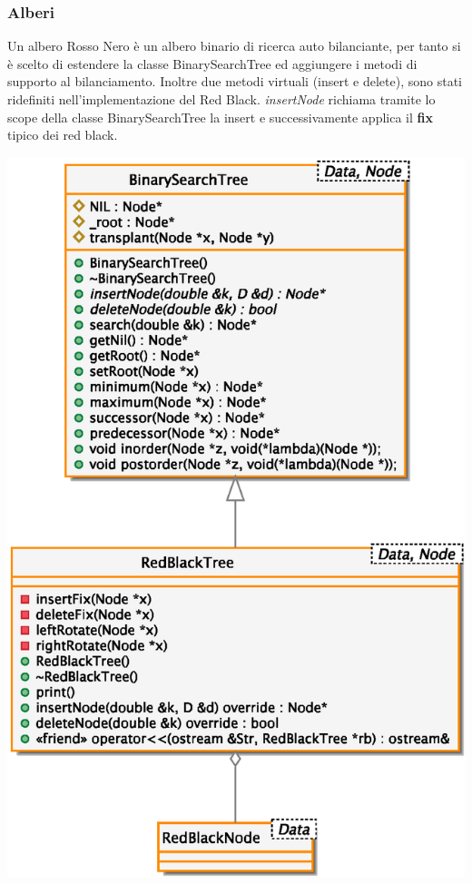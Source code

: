 \subsubsection{Alberi}
Un albero Rosso Nero \`e un albero binario di ricerca auto
bilanciante, per tanto si \`e scelto di estendere la classe
BinarySearchTree ed aggiungere i metodi di supporto al bilanciamento. Inoltre due metodi virtuali (insert e delete), sono
stati ridefiniti nell'implementazione del Red Black.
\textit{insertNode} richiama tramite lo scope della classe
BinarySearchTree la insert e successivamente applica il
\textbf{fix} tipico dei red black.
\begin{center}
\includegraphics[scale=0.6]{tesina_tex/rbhash/2img/trees.eps}
\end{center}
